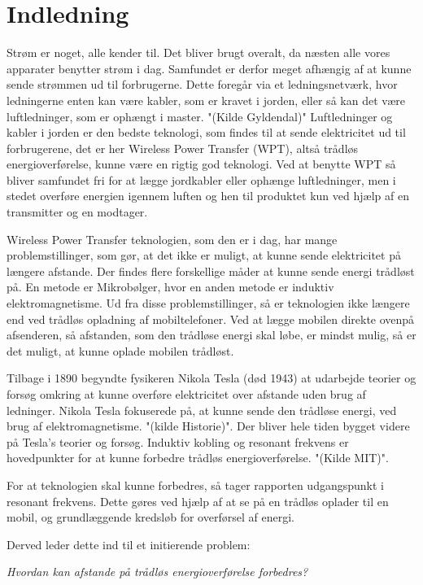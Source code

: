 \chapter{Indledning}
Strøm er noget, alle kender til. Det bliver brugt overalt, da næsten alle vores apparater benytter strøm i dag. Samfundet er derfor meget afhængig af at kunne sende strømmen ud til forbrugerne. Dette foregår via et ledningsnetværk, hvor ledningerne enten kan være kabler, som er kravet i jorden, eller så kan det være luftledninger, som er ophængt i master. "(Kilde Gyldendal)" Luftledninger og kabler i jorden er den bedste teknologi, som findes til at sende elektricitet ud til forbrugerene, det er her Wireless Power Transfer (WPT), altså trådløs energioverførelse, kunne være en rigtig god teknologi. Ved at benytte WPT så bliver samfundet fri for at lægge jordkabler eller ophænge luftledninger, men i stedet overføre energien igennem luften og hen til produktet kun ved hjælp af en transmitter og en modtager.

Wireless Power Transfer teknologien, som den er i dag, har mange problemstillinger, som gør, at det ikke er muligt, at kunne sende elektricitet på længere afstande. Der findes flere forskellige måder at kunne sende energi trådløst på. En metode er Mikrobølger, hvor en anden metode er induktiv elektromagnetisme. Ud fra disse problemstillinger, så er teknologien ikke længere end ved trådløs opladning af mobiltelefoner. Ved at lægge mobilen direkte ovenpå afsenderen, så afstanden, som den trådløse energi skal løbe, er mindst mulig, så er det muligt, at kunne oplade mobilen trådløst.

Tilbage i 1890 begyndte fysikeren Nikola Tesla (død 1943) at udarbejde teorier og forsøg omkring at kunne overføre elektricitet over afstande uden brug af ledninger. Nikola Tesla fokuserede på, at kunne sende den trådløse energi, ved brug af elektromagnetisme. "(kilde Historie)". Der bliver hele tiden bygget videre på Tesla's teorier og forsøg. Induktiv kobling og resonant frekvens er hovedpunkter for at kunne forbedre trådløs energioverførelse. "(Kilde MIT)".

For at teknologien skal kunne forbedres, så tager rapporten udgangspunkt i resonant frekvens. Dette gøres ved hjælp af at se på en trådløs oplader til en mobil, og grundlæggende kredsløb for overførsel af energi.

Derved leder dette ind til et initierende problem:

\textit{Hvordan kan afstande på trådløs energioverførelse forbedres?}